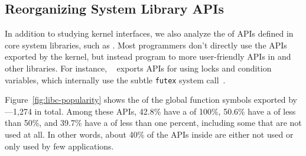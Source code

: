 


\subsection{Reorganizing System Library APIs}
\label{sec:observation:libc}

In addition to studying kernel interfaces, we also analyze the \usagemetric{} of APIs
defined in core system libraries, such as \libc{}.
Most programmers don't directly use the APIs exported by the kernel,
but instead program to more user-friendly APIs in \libc{} and other libraries.
For instance, \glibc{}~\citep{glibc} exports APIs for using locks and condition variables, which internally 
use the subtle {\tt futex} system call~\citep{franke02futex}.

Figure~\ref{fig:libc-popularity} shows the \usagemetric{} of 
the global function symbols exported by 
\libc{}---1,274 in total. %
Among these APIs, 42.8\% have a \usagemetric{} of 100\%,
50.6\% have a \usagemetric{} of less than 50\%,
and 39.7\% have a \usagemetric{} of less than one percent, including some that are not used at all.
In other words, about 40\% of the APIs inside \libc{}
are either not used or only used by few applications.


